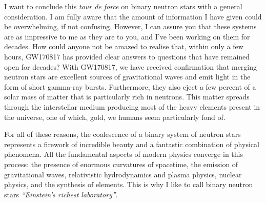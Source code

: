 I want to conclude this \emph{tour de force} on binary neutron stars with a general
consideration. I am fully aware that the amount of information I have given could be
overwhelming, if not confusing. However, I can assure you that these systems are as
impressive to me as they are to you, and I've been working on them for decades. How
could anyone not be amazed to realise that, within only a few hours,
GW170817 has provided clear answers to questions that have remained
open for decades? With GW170817, we have received confirmation that merging neutron
stars are excellent sources of gravitational waves and emit light in the form of short
gamma-ray bursts. Furthermore, they also eject a few percent of a
solar mass of matter that is particularly rich in neutrons. This matter spreads through
the interstellar medium producing most of the heavy elements present in the universe,
one of which, gold, we humans seem particularly fond of.

For all of these reasons, the coalescence of a binary system of neutron stars represents
a firework of incredible beauty and a fantastic combination of physical phenomena. All
the fundamental aspects of modern physics converge in this process: the presence of
enormous curvatures of spacetime, the emission of gravitational waves, relativistic
hydrodynamics and plasma physics, nuclear physics, and the synthesis
of elements. This is why I like to call binary neutron stars \emph{``Einstein's richest
laboratory''}.
